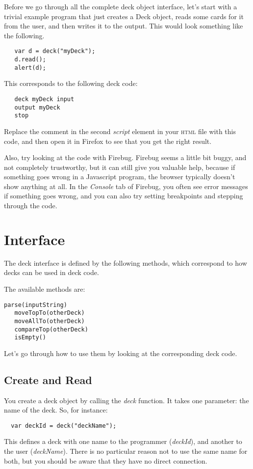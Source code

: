 \documentclass[a4paper,twoside]{tufte-handout}
\begin{document}
Before we go through all the complete deck object interface, let's start with a trivial example program that just creates
a Deck object, reads some cards for it from the user, and then writes
it to the output. This would look something like the following.
\begin{lstlisting}
   var d = deck("myDeck");
   d.read();
   alert(d);
\end{lstlisting}
This corresponds to the following deck code:
\begin{lstlisting}
   deck myDeck input
   output myDeck
   stop
\end{lstlisting}

Replace the comment in the second \emph{script} element in your
\textsc{html} file with this code, and then open it in Firefox to see
that you get the right result.

Also, try looking at the code with Firebug. Firebug seems a little bit
buggy, and not completely trustworthy, but it can still give you
valuable help, because if something goes wrong in a Javascript
program, the browser typically doesn't show anything at all. In the
\emph{Console} tab of Firebug, you often see error messages if
something goes wrong, and you can also try setting breakpoints and
stepping through the code.

\section{Interface}\label{sec-intf}

The deck interface is defined by the following methods, which
correspond to how decks can be used in deck code.

The available methods are:
\begin{lstlisting}[frame=none]
   parse(inputString)
   moveTopTo(otherDeck)
   moveAllTo(otherDeck)
   compareTop(otherDeck)
   isEmpty()
\end{lstlisting}
Let's go through how to use them by looking at the corresponding
deck code.

\subsection{Create and Read}\label{sec-input}

You create a deck object by calling the \emph{deck} function. It takes
one parameter: the name of the deck. So, for instance:
\begin{lstlisting}
  var deckId = deck("deckName");
\end{lstlisting}
This defines a deck with one name to the programmer (\emph{deckId}),
and another to the user (\emph{deckName}). There is no particular
reason not to use the same name for both, but you should be aware that
they have no direct connection.
\end{document}
